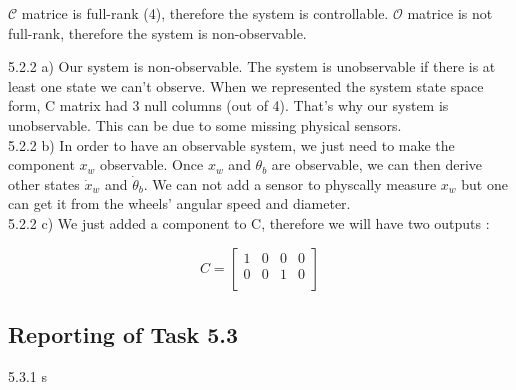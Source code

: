 \documentclass[11pt]{article}
\begin{document}
$\mathcal{C}$ matrice is full-rank (4), therefore the system is controllable. 
$\mathcal{O}$ matrice is not full-rank, therefore the system is non-observable.


5.2.2 a) Our system is non-observable. The system is unobservable if there is at least one state we can’t observe. When we represented the system state space form, C matrix had 3 null columns (out of 4). That’s why our system is unobservable.
This can be due to some missing physical sensors.\\

5.2.2 b) In order to have an observable system, we just need to make the component $x_w$ observable. Once $x_w$ and $\theta_b$ are observable, we can then derive other states $\dot x_w$ and $\dot \theta_b$. We can not add a sensor to physcally measure $x_w$ but one can get it from the wheels' angular speed and diameter.\\

5.2.2 c) We just added a component to C, therefore we will have two outputs :

\begin{equation*}
C=
\begin{bmatrix}
1 & 0 & 0 & 0\\
0 & 0 & 1 & 0\\
\end{bmatrix}
\end{equation*}


\subsection*{Reporting of Task 5.3}

5.3.1 s
\end{document}
